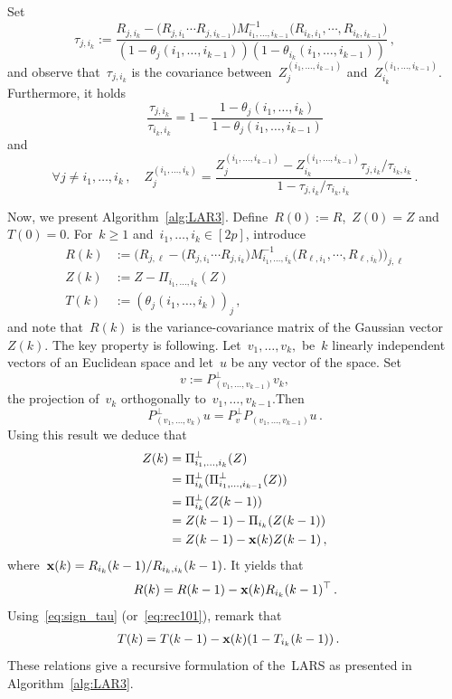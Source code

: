 \documentclass[final,numbib]{imaiai}%
\numberwithin{equation}{section}
\def\eq{\begin{equation}}
\def\qe{\end{equation}}
\def\\bUnif{\text{\bUnif}}
\newcommand{\<}{\langle}
\renewcommand{\>}{\rangle}
\newcommand{\1}{\mathds{1}}
\begin{document}
{\begin{proposition}
\label{prop:moulinette}
Set
\[
\tau_{j,i_k}
:=\frac
{R_{j,i_k} - \big(R_{j, i_1} \cdots R_{j,i_{k-1}}  \big)M^{-1}_{i_1,\ldots, i_{k-1}} \big(R_{i_k, i_1} ,\cdots ,R_{ i_k, i_{k-1}} \big)}
{(1-\theta_j(i_1,\ldots, i_{k-1}))(1-\theta_{i_k}(i_1,\ldots, i_{k-1}))}\,,
\]
and observe that~$\tau_{j,i_k}$ is the covariance between~$Z^{(i_1,\ldots, i_{k-1})}_j$ and~$Z^{(i_1,\ldots, i_{k-1})}_{i_k}$. Furthermore, it holds %
\eq
\label{eq:sign_tau}
\frac{\tau_{j,i_k}}{\tau_{i_k,i_k}}=1-\frac{1-\theta_j(i_1,\ldots, i_{k})}{1-\theta_j(i_1,\ldots, i_{k-1})}
\qe 
and 
\eq
\label{eq:rec_Zj}
\forall j\neq i_1,\ldots,i_{k}\,,\quad
Z^{(i_1,\ldots, i_{k})}_j=
\frac{Z^{(i_1,\ldots, i_{k-1})}_j-Z^{(i_1,\ldots, i_{k-1})}_{i_k}\tau_{j,i_k}/\tau_{i_k,i_k}}
{1-\tau_{j,i_k}/\tau_{i_k,i_k}}\,.
\qe
\end{proposition}

\noindent
Now, we present Algorithm~\ref{alg:LAR3}. Define~$R(0):=R$,~$Z(0)=Z$ and~$T(0)=0$. For~$k\geq1$ and~$i_1, \ldots, i_{k}\in[2p]$, introduce
\begin{align*}
R(k)&:=\Big({R_{j,\ell} - \big(R_{j,i_1} \cdots R_{j,i_{k}}  \big)M^{-1}_{i_1,\ldots, i_{k}} \big(R_{\ell, i_1} ,\cdots ,R_{ \ell, i_{k}} \big)}\Big)_{j,\ell}\\
Z(k)&:=Z-\Pi_{ i_1,\ldots, i_{k}} (Z)\\
T(k)&:=(\theta_j(i_1,\ldots, i_{k}))_j\,,
\end{align*}
and note that~$R(k)$ is the variance-covariance matrix of the Gaussian vector~$Z(k)$. The key property is following. Let~$v_1,  \ldots, v_k,$ be~$k$ linearly independent vectors of an Euclidean space and let~$u$ be any vector of the space. Set
\[
v:=  P_{(v_1, \ldots, v_{k-1})} ^\perp v_k,
\] 
the  projection of~$v_k$ orthogonally to~$v_1, \ldots, v_{k-1}$.Then 
\[ 
 P_{(v_1, \ldots, v_k)}^\perp u = P_{v}^\perp P_{(v_1, \ldots, v_{k-1})} u\,.
\]
Using this result we deduce that
\begin{align}
Z(k)
&=\Pi^\perp_{ i_1,\ldots, i_{k}} (Z)\notag\\
&=\Pi^\perp_{ i_{k}}(\Pi^\perp_{ i_1,\ldots, i_{k-1}} (Z))\notag\\
&=\Pi^\perp_{ i_{k}}(Z(k-1))\notag\\
&=Z(k-1)-\Pi_{ i_{k}}(Z(k-1))\notag\\
&=Z(k-1)-{\bf x}(k) Z(k-1)\label{eq:LAR3_1}\,,
\end{align}
where~${\bf x}(k)=R_{i_k}(k-1)/R_{i_k,i_k}(k-1)$. It yields that 
\eq
\label{eq:LAR3_2}
R(k)=R(k-1)-{\bf x}(k) R_{i_k}(k-1)^\top\,.
\qe
Using~\eqref{eq:sign_tau} (or~\eqref{eq:rec101}), remark that 
\begin{align}
T(k)%
&=T(k-1)-{\bf x}(k) (1-T_{i_k}(k-1))
\label{eq:LAR3_3}
\,.
\end{align}
These relations give a recursive formulation of the~LARS as presented in Algorithm~\ref{alg:LAR3}.


}
\end{document}
